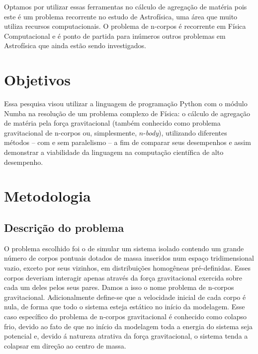 \documentclass[
	12pt,				%
	a4paper,			%
	english,			%
	openright,				%
	brazil,				%
	oneside]{abntex2}
\begin{document}
	Optamos por utilizar essas ferramentas no cálculo de agregação de matéria pois este é um problema recorrente no estudo de Astrofísica, uma área que muito utiliza recursos computacionais. O problema de n-corpos é recorrente em Física Computacional \cite{goz2019direct} e é ponto de partida para inúmeros outros problemas em Astrofísica que ainda estão sendo investigados.
	
	
	\chapter[Objetivos]{Objetivos}

	Essa pesquisa visou utilizar a linguagem de programação Python com o módulo Numba na resolução de um problema complexo de Física: o cálculo de agregação de matéria pela força gravitacional (também conhecido como problema gravitacional de n-corpos ou, simplesmente, $n$-\textit{body}), utilizando diferentes métodos -- com e sem paralelismo -- a fim de comparar seus desempenhos e assim demonstrar a viabilidade da linguagem na computação científica de alto desempenho.



\chapter[Metodologia]{Metodologia}

\section{Descrição do problema}
	
	O problema escolhido foi o de simular um sistema isolado contendo um grande número de corpos pontuais dotados de massa inseridos num espaço tridimensional vazio, exceto por seus vizinhos, em distribuições homogêneas pré-definidas. Esses corpos deveriam interagir apenas através da força gravitacional exercida sobre cada um deles pelos seus pares. Damos a isso o nome problema de n-corpos gravitacional. Adicionalmente define-se que a velocidade inicial de cada corpo é nula, de forma que todo o sistema esteja estático no início da modelagem. Esse caso específico do problema de n-corpos gravitacional é conhecido como colapso frio, devido ao fato de que no início da modelagem toda a energia do sistema seja  potencial e, devido á natureza atrativa da força gravitacional, o sistema tenda a colapsar em direção ao centro de massa.
	
\end{document}
